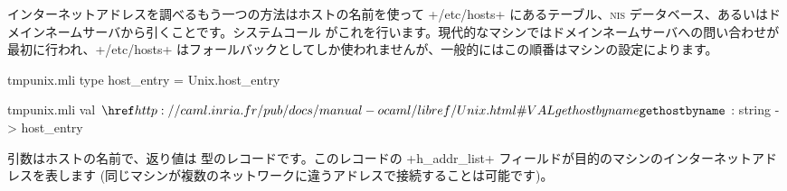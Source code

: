 インターネットアドレスを調べるもう一つの方法はホストの名前を使って \ml+/etc/hosts+ にあるテーブル、\textsc{nis} データベース、あるいはドメインネームサーバから引くことです。システムコール  がこれを行います。現代的なマシンではドメインネームサーバへの問い合わせが最初に行われ、\ml+/etc/hosts+ はフォールバックとしてしか使われませんが、一般的にはこの順番はマシンの設定によります。
%
\begin{codefile}{tmpunix.mli}
type host_entry = Unix.host_entry
\end{codefile}
%
\begin{listingcodefile}{tmpunix.mli}
val $\libvalue{Unix}{gethostbyname}$ : string -> host_entry
\end{listingcodefile}
%
引数はホストの名前で、返り値は  型のレコードです。このレコードの \ml+h_addr_list+ フィールドが目的のマシンのインターネットアドレスを表します (同じマシンが複数のネットワークに違うアドレスで接続することは可能です)。

